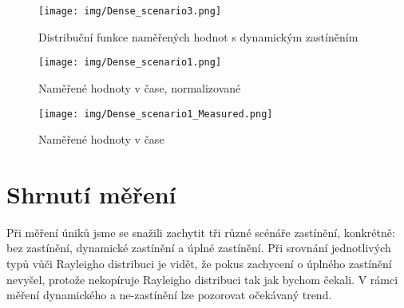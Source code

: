 \clearpage

\begin{figure}[h!]
    \centering
    \texttt{[image: img/Dense\_scenario3.png]}
    \caption{Distribuční funkce naměřených hodnot s dynamickým zastíněním}
    \label{fig:my_label}
\end{figure}



\begin{figure}[h!]
    \centering
    \texttt{[image: img/Dense\_scenario1.png]}
    \caption{Naměřené hodnoty v čase, normalizované}
    \label{fig:my_label}
\end{figure}
\clearpage
\begin{figure}[h!]
    \centering
    \texttt{[image: img/Dense\_scenario1\_Measured.png]}
    \caption{Naměřené hodnoty v čase}
    \label{fig:my_label}
\end{figure}

\section{Shrnutí měření}
Při měření úniků jsme se snažili zachytit tři různé scénáře zastínění, konkrétně: bez zastínění, dynamické zastínění a úplné zastínění.
Při srovnání jednotlivých typů vůči Rayleigho distribuci je vidět, že pokus zachycení o úplného zastínění nevyšel, protože nekopíruje Rayleigho distribuci tak jak bychom čekali. 
V rámci měření dynamického a ne-zastínění lze pozorovat očekávaný trend.




